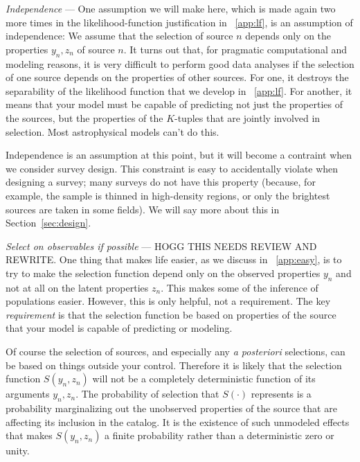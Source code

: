 \documentclass[modern]{aastex62}
\newcommand{\sectionname}{Section}
\newcommand{\foreign}[1]{\textsl{#1}}
\renewcommand{\paragraph}[1]{\medskip\noindent\textit{#1} ---}
\begin{document}
\paragraph{Independence}
One assumption we will make here, which is made again two more times
in the likelihood-function justification in
\appendixname~\ref{app:lf}, is an assumption of independence:
We assume that the selection of source $n$ depends only on
the properties $y_n, z_n$ of source $n$.
It turns out that, for pragmatic computational and modeling reasons,
it is very difficult to perform good data analyses if the selection of
one source depends on the properties of other sources.
For one, it destroys the separability of the likelihood function
that we develop in \appendixname~\ref{app:lf}.
For another, it means that your model must be capable of predicting
not just the properties of the sources, but the properties of the
$K$-tuples that are jointly involved in selection.
Most astrophysical models can't do this.

Independence is an assumption at this point, but it will become a contraint
when we consider survey design.
This constraint is easy to accidentally violate when
designing a survey; many surveys do not have this property (because,
for example, the sample is thinned in high-density regions, or only
the brightest sources are taken in some fields).
We will say more about this in \sectionname~\ref{sec:design}.

\paragraph{Select on observables if possible} HOGG THIS NEEDS REVIEW AND REWRITE.
One thing that makes life easier, as we discuss in \appendixname~\ref{app:easy},
is to try to make the selection function depend only on the observed
properties $y_n$ and not at all on the latent properties $z_n$.
This makes some of the inference of populations easier.
However, this is only helpful, not a requirement.
The key \emph{requirement} is that the selection function be based
on properties of the source that your model is capable of predicting
or modeling.

Of course the selection of sources, and especially any \foreign{a
  posteriori} selections, can be based on things outside your control.
Therefore it is likely that the selection function $S(y_n, z_n)$ will
not be a completely deterministic function of its arguments $y_n, z_n$.
The probability of selection that $S(\cdot)$ represents is a
probability marginalizing out the unobserved properties of the source
that are affecting its inclusion in the catalog.
It is the existence of such unmodeled effects that makes $S(y_n, z_n)$
a finite probability rather than a deterministic zero or unity.
\end{document}
